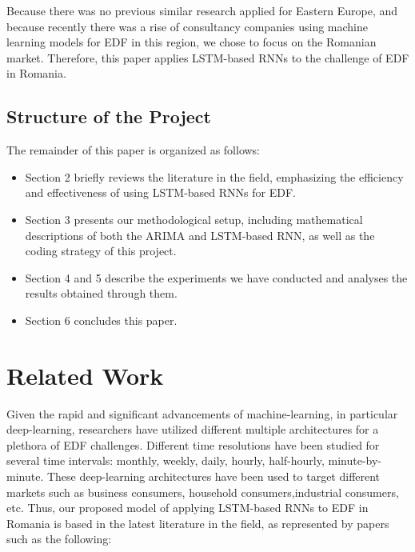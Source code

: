 \documentclass[10pt,twocolumn,letterpaper]{article}
\begin{document}
Because there was no previous similar research applied for Eastern Europe, and because recently there was a rise of consultancy companies using machine learning models for EDF in this region, we chose to focus on the Romanian market. Therefore, this paper applies LSTM-based RNNs to the challenge of EDF in Romania.


\subsection{Structure of the Project}
The remainder of this paper is organized as follows:
\begin{itemize}
    \item Section 2 briefly reviews the literature in the field, emphasizing the efficiency and effectiveness of using LSTM-based RNNs for EDF.
    \item Section 3 presents our methodological setup, including mathematical descriptions of both the ARIMA and LSTM-based RNN, as well as the coding strategy of this project.
    \item Section 4 and 5 describe the experiments we have conducted and analyses the results obtained through them.
    \item Section 6 concludes this paper.
\end{itemize}





\section{Related Work}

Given the rapid and significant advancements of machine-learning, in particular deep-learning, researchers have utilized different multiple architectures for a plethora of EDF challenges. Different time resolutions have been studied for several time intervals: monthly, weekly, daily, hourly, half-hourly, minute-by-minute. These deep-learning architectures have been used to target different markets such as business consumers, household consumers,industrial consumers, etc. Thus, our proposed model of applying LSTM-based RNNs to EDF in Romania is based in the latest literature in the field, as represented by papers such as the following:
\end{document}
